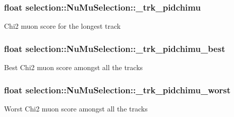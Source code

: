 \subsubsection[{\texorpdfstring{\+\_\+trk\+\_\+pidchimu}{_trk_pidchimu}}]{\setlength{\rightskip}{0pt plus 5cm}float selection\+::\+Nu\+Mu\+Selection\+::\+\_\+trk\+\_\+pidchimu\hspace{0.3cm}{\ttfamily [private]}}\hypertarget{classselection_1_1NuMuSelection_a3ae2c291adeedd490d43b915257553f7}{}\label{classselection_1_1NuMuSelection_a3ae2c291adeedd490d43b915257553f7}
Chi2 muon score for the longest track 
\subsubsection[{\texorpdfstring{\+\_\+trk\+\_\+pidchimu\+\_\+best}{_trk_pidchimu_best}}]{\setlength{\rightskip}{0pt plus 5cm}float selection\+::\+Nu\+Mu\+Selection\+::\+\_\+trk\+\_\+pidchimu\+\_\+best\hspace{0.3cm}{\ttfamily [private]}}\hypertarget{classselection_1_1NuMuSelection_a5bdc83ae76241b73654f99768ea43ffb}{}\label{classselection_1_1NuMuSelection_a5bdc83ae76241b73654f99768ea43ffb}
Best Chi2 muon score amongst all the tracks 
\subsubsection[{\texorpdfstring{\+\_\+trk\+\_\+pidchimu\+\_\+worst}{_trk_pidchimu_worst}}]{\setlength{\rightskip}{0pt plus 5cm}float selection\+::\+Nu\+Mu\+Selection\+::\+\_\+trk\+\_\+pidchimu\+\_\+worst\hspace{0.3cm}{\ttfamily [private]}}\hypertarget{classselection_1_1NuMuSelection_ad1761cb4833e688d27f6f95321156136}{}\label{classselection_1_1NuMuSelection_ad1761cb4833e688d27f6f95321156136}
Worst Chi2 muon score amongst all the tracks 
